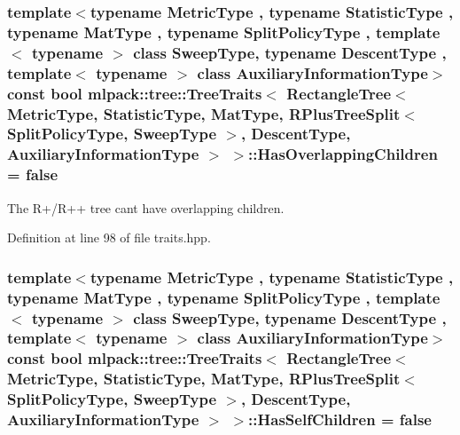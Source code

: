 \subsubsection[{Has\+Overlapping\+Children}]{\setlength{\rightskip}{0pt plus 5cm}template$<$typename Metric\+Type , typename Statistic\+Type , typename Mat\+Type , typename Split\+Policy\+Type , template$<$ typename $>$ class Sweep\+Type, typename Descent\+Type , template$<$ typename $>$ class Auxiliary\+Information\+Type$>$ const bool {\bf mlpack\+::tree\+::\+Tree\+Traits}$<$ {\bf Rectangle\+Tree}$<$ Metric\+Type, Statistic\+Type, Mat\+Type, {\bf R\+Plus\+Tree\+Split}$<$ Split\+Policy\+Type, Sweep\+Type $>$, Descent\+Type, Auxiliary\+Information\+Type $>$ $>$\+::Has\+Overlapping\+Children = false\hspace{0.3cm}{\ttfamily [static]}}\label{classmlpack_1_1tree_1_1TreeTraits_3_01RectangleTree_3_01MetricType_00_01StatisticType_00_01MatTyd3300c6b7e2f56d4c1027298545eb7bf_afd2d70fcc10aba20a5135ceb958e2561}


The R+/\+R++ tree can\textquotesingle{}t have overlapping children. 



Definition at line 98 of file traits.\+hpp.

\subsubsection[{Has\+Self\+Children}]{\setlength{\rightskip}{0pt plus 5cm}template$<$typename Metric\+Type , typename Statistic\+Type , typename Mat\+Type , typename Split\+Policy\+Type , template$<$ typename $>$ class Sweep\+Type, typename Descent\+Type , template$<$ typename $>$ class Auxiliary\+Information\+Type$>$ const bool {\bf mlpack\+::tree\+::\+Tree\+Traits}$<$ {\bf Rectangle\+Tree}$<$ Metric\+Type, Statistic\+Type, Mat\+Type, {\bf R\+Plus\+Tree\+Split}$<$ Split\+Policy\+Type, Sweep\+Type $>$, Descent\+Type, Auxiliary\+Information\+Type $>$ $>$\+::Has\+Self\+Children = false\hspace{0.3cm}{\ttfamily [static]}}\label{classmlpack_1_1tree_1_1TreeTraits_3_01RectangleTree_3_01MetricType_00_01StatisticType_00_01MatTyd3300c6b7e2f56d4c1027298545eb7bf_aae6d3f95fe8de6168ae53a3021efc58d}


